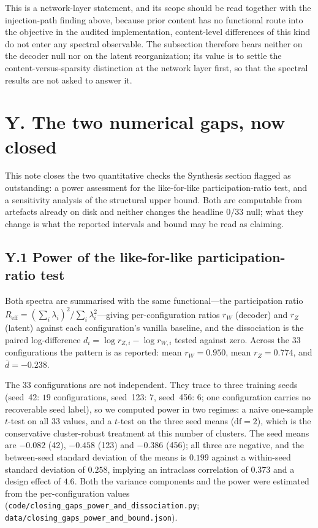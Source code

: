 \documentclass[11 pt,a4 paper]{article}
\begin{document}
This is a network-layer statement, and its scope should be read together with the injection-path finding above, because prior content has no functional route into the objective in the audited implementation, content-level differences of this kind do not enter any spectral observable. The subsection therefore bears neither on the decoder null nor on the latent reorganization; its value is to settle the content-versus-sparsity distinction at the network layer first, so that the spectral results are not asked to answer it.

\section*{Y. The two numerical gaps, now closed}

This note closes the two quantitative checks the Synthesis section flagged as outstanding: a power assessment for the like-for-like participation-ratio test, and a sensitivity analysis of the structural upper bound. Both are computable from artefacts already on disk and neither changes the headline $0/33$ null; what they change is what the reported intervals and bound may be read as claiming.

\subsection*{Y.1 Power of the like-for-like participation-ratio test}

Both spectra are summarised with the same functional---the participation ratio $R_{\mathrm{eff}}=(\sum_i\lambda_i)^2/\sum_i\lambda_i^2$---giving per-configuration ratios $r_W$ (decoder) and $r_Z$ (latent) against each configuration's vanilla baseline, and the dissociation is the paired log-difference $d_i=\log r_{Z,i}-\log r_{W,i}$ tested against zero. Across the $33$ configurations the pattern is as reported: mean $r_W=0.950$, mean $r_Z=0.774$, and $\bar d=-0.238$.

The $33$ configurations are not independent. They trace to three training seeds (seed~42: $19$ configurations, seed~123: $7$, seed~456: $6$; one configuration carries no recoverable seed label), so we computed power in two regimes: a naive one-sample $t$-test on all $33$ values, and a $t$-test on the three seed means ($\mathrm{df}=2$), which is the conservative cluster-robust treatment at this number of clusters. The seed means are $-0.082$ (42), $-0.458$ (123) and $-0.386$ (456); all three are negative, and the between-seed standard deviation of the means is $0.199$ against a within-seed standard deviation of $0.258$, implying an intraclass correlation of $0.373$ and a design effect of $4.6$. Both the variance components and the power were estimated from the per-configuration values (\texttt{code/closing\_gaps\_power\_and\_dissociation.py}; \texttt{data/closing\_gaps\_power\_and\_bound.json}).
\end{document}
